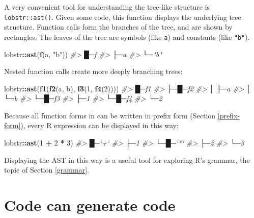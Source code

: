 \documentclass[]{book}
\newenvironment{Shaded}{\begin{snugshade}}{\end{snugshade}}
\newcommand{\CommentTok}[1]{\textcolor[rgb]{0.37,0.37,0.37}{\textit{#1}}}
\newcommand{\DecValTok}[1]{\textcolor[rgb]{0.06,0.06,0.06}{#1}}
\newcommand{\KeywordTok}[1]{\textcolor[rgb]{0.27,0.27,0.27}{\textbf{#1}}}
\newcommand{\NormalTok}[1]{#1}
\newcommand{\OperatorTok}[1]{\textcolor[rgb]{0.43,0.43,0.43}{\textbf{#1}}}
\newcommand{\StringTok}[1]{\textcolor[rgb]{0.5,0.5,0.5}{#1}}
\begin{document}
A very convenient tool for understanding the tree-like structure is \texttt{lobstr::ast()}. Given some code, this function displays the underlying tree structure. Function calls form the branches of the tree, and are shown by rectangles. The leaves of the tree are symbols (like \texttt{a}) and constants (like \texttt{"b"}).

\begin{Shaded}
\begin{Highlighting}[]
\NormalTok{lobstr}\OperatorTok{::}\KeywordTok{ast}\NormalTok{(}\KeywordTok{f}\NormalTok{(a, }\StringTok{"b"}\NormalTok{))}
\CommentTok{#> █─f }
\CommentTok{#> ├─a }
\CommentTok{#> └─"b"}
\end{Highlighting}
\end{Shaded}

Nested function calls create more deeply branching trees:

\begin{Shaded}
\begin{Highlighting}[]
\NormalTok{lobstr}\OperatorTok{::}\KeywordTok{ast}\NormalTok{(}\KeywordTok{f1}\NormalTok{(}\KeywordTok{f2}\NormalTok{(a, b), }\KeywordTok{f3}\NormalTok{(}\DecValTok{1}\NormalTok{, }\KeywordTok{f4}\NormalTok{(}\DecValTok{2}\NormalTok{))))}
\CommentTok{#> █─f1 }
\CommentTok{#> ├─█─f2 }
\CommentTok{#> │ ├─a }
\CommentTok{#> │ └─b }
\CommentTok{#> └─█─f3 }
\CommentTok{#>   ├─1 }
\CommentTok{#>   └─█─f4 }
\CommentTok{#>     └─2}
\end{Highlighting}
\end{Shaded}

Because all function forms in can be written in prefix form (Section \ref{prefix-form}), every R expression can be displayed in this way:

\begin{Shaded}
\begin{Highlighting}[]
\NormalTok{lobstr}\OperatorTok{::}\KeywordTok{ast}\NormalTok{(}\DecValTok{1} \OperatorTok{+}\StringTok{ }\DecValTok{2} \OperatorTok{*}\StringTok{ }\DecValTok{3}\NormalTok{)}
\CommentTok{#> █─`+` }
\CommentTok{#> ├─1 }
\CommentTok{#> └─█─`*` }
\CommentTok{#>   ├─2 }
\CommentTok{#>   └─3}
\end{Highlighting}
\end{Shaded}

Displaying the AST in this way is a useful tool for exploring R's grammar, the topic of Section \ref{grammar}.

\hypertarget{coding-code}{%
\section{Code can generate code}\label{coding-code}}
\end{document}
